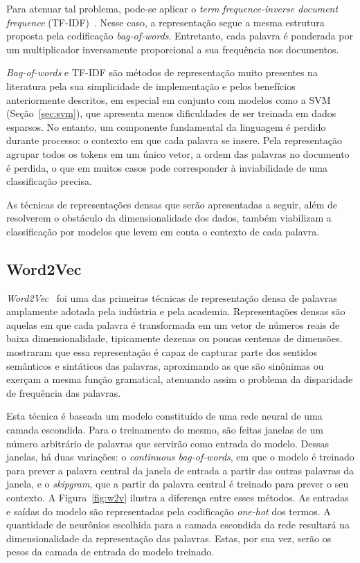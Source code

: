 Para atenuar tal problema, pode-se aplicar o \textit{term frequence-inverse
document frequence} (TF-IDF)~\cite{salton88}.
Nesse caso, a representação segue a mesma estrutura proposta pela codificação
\textit{bag-of-words}.
Entretanto, cada palavra é ponderada por um multiplicador inversamente
proporcional a sua frequência nos documentos.


\textit{Bag-of-words} e TF-IDF são métodos de representação muito presentes na
literatura pela sua simplicidade de implementação e pelos benefícios
anteriormente descritos, em especial em conjunto com modelos como a
SVM (Seção~\ref{sec:svm}), que apresenta menos dificuldades de ser treinada em
dados esparsos.
No entanto, um componente fundamental da linguagem é perdido durante processo: o
contexto em que cada palavra se insere.
Pela representação agrupar todos os tokens em um único vetor, a ordem das
palavras no documento é perdida, o que em muitos casos pode corresponder à
inviabilidade de uma classificação precisa.


As técnicas de representações densas que serão apresentadas a seguir, além de
resolverem o obstáculo da dimensionalidade dos dados, também viabilizam a
classificação por modelos que levem em conta o contexto de cada palavra.

\subsection{Word2Vec} \label{sec:w2v}

\textit{Word2Vec}~\cite{mikolov13} foi uma das primeiras técnicas de
representação densa de palavras amplamente adotada pela indústria e pela academia.
Representações densas são aquelas em que cada palavra é transformada em um vetor
de números reais de baixa dimensionalidade, tipicamente dezenas ou poucas
centenas de dimensões.
\citet{mikolov13} mostraram que essa representação é capaz de capturar parte dos
sentidos semânticos e sintáticos das palavras, aproximando as que são sinônimas
ou exerçam a mesma função gramatical, atenuando assim o problema da disparidade
de frequência das palavras.

Esta técnica é baseada um modelo constituído de uma rede neural de uma camada escondida.
Para o treinamento do mesmo, são feitas janelas de um número arbitrário de
palavras que servirão como entrada do modelo.
Dessas janelas, há duas variações: o \textit{continuous bag-of-words}, em que
o modelo é treinado para prever a palavra central da janela de entrada a partir
das outras palavras da janela, e o \textit{skipgram}, que a partir da palavra
central é treinado para prever o seu contexto.
A Figura~\ref{fig:w2v} ilustra a diferença entre esses métodos.
As entradas e saídas do modelo são representadas pela codificação
\textit{one-hot} dos termos.
A quantidade de neurônios escolhida para a camada escondida da rede resultará na
dimensionalidade da representação das palavras.
Estas, por sua vez, serão os pesos da camada de entrada do modelo treinado.

